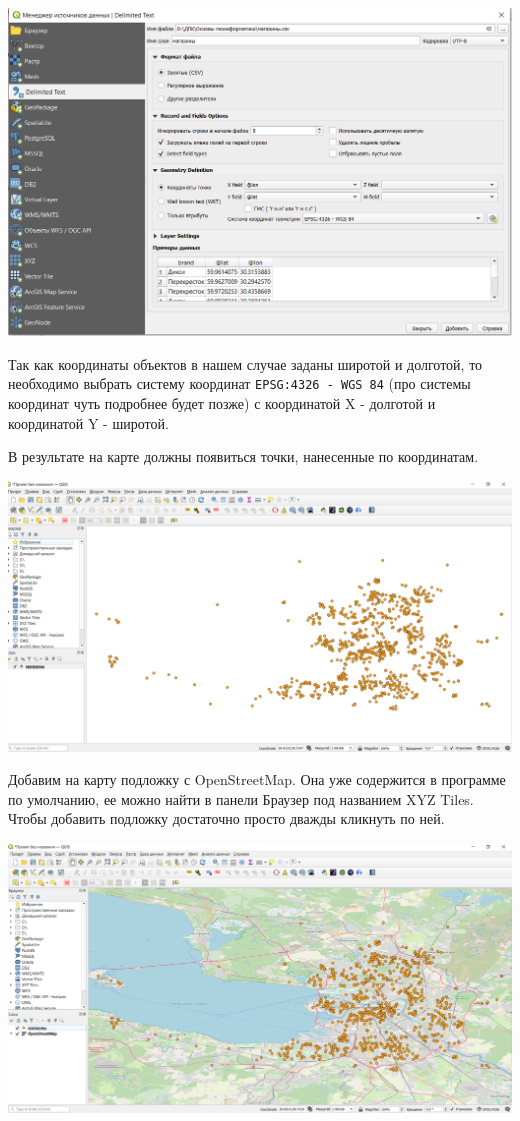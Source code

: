 \documentclass[
]{book}
\begin{document}
\includegraphics{figures/3.PNG}

Так как координаты объектов в нашем случае заданы широтой и долготой, то необходимо выбрать систему координат \texttt{EPSG:4326\ -\ WGS\ 84} (про системы координат чуть подробнее будет позже) с координатой X - долготой и координатой Y - широтой.

В результате на карте должны появиться точки, нанесенные по координатам.

\includegraphics{figures/4.PNG}

Добавим на карту подложку с OpenStreetMap. Она уже содержится в программе по умолчанию, ее можно найти в панели Браузер под названием XYZ Tiles. Чтобы добавить подложку достаточно просто дважды кликнуть по ней.

\includegraphics{figures/5.PNG}
\end{document}
